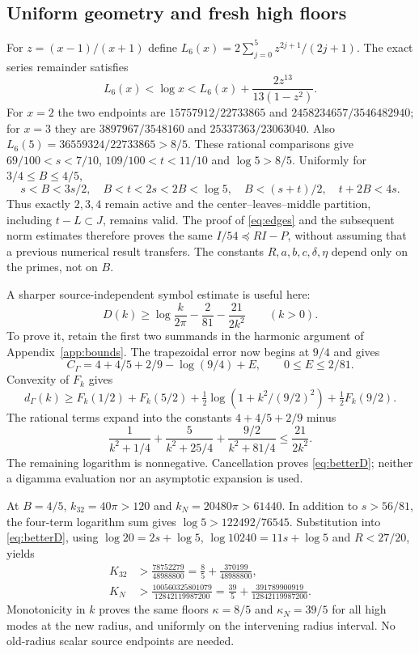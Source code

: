 \documentclass[11pt]{article}
\begin{document}
\subsection{Uniform geometry and fresh high floors}
For $z=(x-1)/(x+1)$ define $L_6(x)=2\sum_{j=0}^5z^{2j+1}/(2j+1)$. The exact series remainder satisfies
\[
 L_6(x)<\log x<L_6(x)+\frac{2z^{13}}{13(1-z^2)}.
\]
For $x=2$ the two endpoints are $15757912/22733865$ and $2458234657/3546482940$; for $x=3$ they are $3897967/3548160$ and $25337363/23063040$. Also $L_6(5)=36559324/22733865>8/5$. These rational comparisons give $69/100<s<7/10$, $109/100<t<11/10$ and $\log5>8/5$. Uniformly for $3/4\le B\le4/5$,
\[
 s<B<3s/2,\quad B<t<2s<2B<\log5,\quad
 B<(s+t)/2,\quad t+2B<4s.
\]
Thus exactly $2,3,4$ remain active and the center--leaves--middle partition, including $t-L\subset J$, remains valid. The proof of \eqref{eq:edges} and the subsequent norm estimates therefore proves the same $I/54\preceq RI-P$, without assuming that a previous numerical result transfers. The constants $R,a,b,c,\delta,\eta$ depend only on the primes, not on $B$.

A sharper source-independent symbol estimate is useful here:
\begin{equation}
 D(k)\ge\log\frac{k}{2\pi}-\frac2{81}-\frac{21}{2k^2}\qquad(k>0).\label{eq:betterD}
\end{equation}
To prove it, retain the first two summands in the harmonic argument of Appendix~\ref{app:bounds}. The trapezoidal error now begins at $9/4$ and gives
\[
 C_\Gamma=4+4/5+2/9-\log(9/4)+E,\qquad 0\le E\le2/81.
\]
Convexity of $F_k$ gives
\[
 d_\Gamma(k)\ge F_k(1/2)+F_k(5/2)
 +\tfrac12\log(1+k^2/(9/2)^2)+\tfrac12 F_k(9/2).
\]
The rational terms expand into the constants $4+4/5+2/9$ minus
\[
 \frac1{k^2+1/4}+\frac5{k^2+25/4}
 +\frac{9/2}{k^2+81/4}\le\frac{21}{2k^2}.
\]
The remaining logarithm is nonnegative. Cancellation proves \eqref{eq:betterD}; neither a digamma evaluation nor an asymptotic expansion is used.

At $B=4/5$, $k_{32}=40\pi>120$ and $k_N=20480\pi>61440$. In addition to $s>56/81$, the four-term logarithm sum gives $\log5>122492/76545$. Substitution into \eqref{eq:betterD}, using $\log20=2s+\log5$, $\log10240=11s+\log5$ and $R<27/20$, yields
\begin{align}
 K_{32}&>\frac{78752279}{48988800}
       =\frac85+\frac{370199}{48988800},\nonumber\\
 K_N&>\frac{100560325801079}{12842119987200}
       =\frac{39}5+\frac{391789900919}{12842119987200}.\label{eq:newfloors}
\end{align}
Monotonicity in $k$ proves the same floors $\kappa=8/5$ and $\kappa_N=39/5$ for all high modes at the new radius, and uniformly on the intervening radius interval. No old-radius scalar source endpoints are needed.
\end{document}
